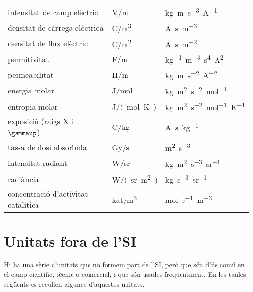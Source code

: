 \begin{longtable}[h]{lll}
   intensitat de camp elèctric & \si{V/m}& \si{kg.m.s^{-3}.A^{-1}}  \\
   densitat de càrrega elèctrica & \si{C/m^3} & \si{A.s.m^{-3}} \\
   densitat de flux elèctric & \si{C/m^2} & \si{A.s.m^{-2}}\\
   permitivitat &  \si{F/m}& \si{kg^{-1}.m^{-3}.s^4.A^2} \\
   permeabilitat &  \si{H/m} & \si{kg.m.s^{-2}.A^{-2}} \\
   energia molar & \si{J/mol} & \si{kg.m^2.s^{-2}.mol^{-1}} \\
   entropia molar& \si{J/(mol.K)} & \si{kg.m^2.s^{-2}.mol^{-1}.K^{-1}} \\
   exposició (raigs X i $\gammaup$) & \si{C/kg} & \si{A.s.kg^{-1}} \\
   tassa de dosi absorbida & \si{Gy/s} & \si{m^2.s^{-3}}\\
   intensitat radiant & \si{W/sr} & \si{kg.m^2.s^{-3}.sr^{-1}} \\
   radiància & \si{W/(sr.m^2)} & \si{kg.s^{-3}.sr^{-1}} \\
   concentració d'activitat catalítica &  \si{kat/m^3} & \si{mol.s^{-1}.m^{-3}}\\
    \bottomrule[1pt]
\end{longtable}



\section{Unitats fora de l'SI}\label{sec:unitats-fora-SI}

Hi ha una sèrie d'unitats que no formem part de l'SI, però que són d'ús comú en el camp científic, tècnic o comercial, i que són usades freqüentment. En les taules següents es recullen algunes d'aquestes unitats.

